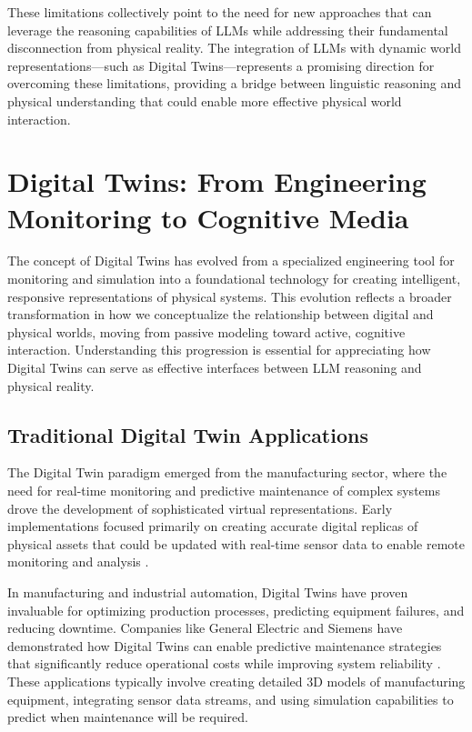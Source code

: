 These limitations collectively point to the need for new approaches that can leverage the reasoning capabilities of LLMs while addressing their fundamental disconnection from physical reality. The integration of LLMs with dynamic world representations—such as Digital Twins—represents a promising direction for overcoming these limitations, providing a bridge between linguistic reasoning and physical understanding that could enable more effective physical world interaction.

\section{Digital Twins: From Engineering Monitoring to Cognitive Media}

The concept of Digital Twins has evolved from a specialized engineering tool for monitoring and simulation into a foundational technology for creating intelligent, responsive representations of physical systems. This evolution reflects a broader transformation in how we conceptualize the relationship between digital and physical worlds, moving from passive modeling toward active, cognitive interaction. Understanding this progression is essential for appreciating how Digital Twins can serve as effective interfaces between LLM reasoning and physical reality.

\subsection{Traditional Digital Twin Applications}

The Digital Twin paradigm emerged from the manufacturing sector, where the need for real-time monitoring and predictive maintenance of complex systems drove the development of sophisticated virtual representations. Early implementations focused primarily on creating accurate digital replicas of physical assets that could be updated with real-time sensor data to enable remote monitoring and analysis \cite{grieves2014digital, rosen2015about}.

In manufacturing and industrial automation, Digital Twins have proven invaluable for optimizing production processes, predicting equipment failures, and reducing downtime. Companies like General Electric and Siemens have demonstrated how Digital Twins can enable predictive maintenance strategies that significantly reduce operational costs while improving system reliability \cite{tao2018digital}. These applications typically involve creating detailed 3D models of manufacturing equipment, integrating sensor data streams, and using simulation capabilities to predict when maintenance will be required.

